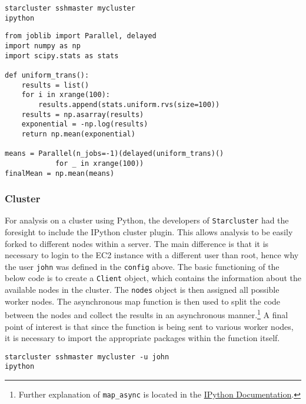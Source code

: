 \documentclass[12pt, letterpaper]{article}
\begin{document}
\begin{verbatim}
starcluster sshmaster mycluster
ipython
\end{verbatim}

\begin{lstlisting}
from joblib import Parallel, delayed
import numpy as np
import scipy.stats as stats

def uniform_trans():
    results = list()
    for i in xrange(100):
        results.append(stats.uniform.rvs(size=100))
    results = np.asarray(results)
    exponential = -np.log(results)
    return np.mean(exponential)
    
means = Parallel(n_jobs=-1)(delayed(uniform_trans)() 
            for _ in xrange(100))
finalMean = np.mean(means)

\end{lstlisting}

\subsubsection*{Cluster}

For analysis on a cluster using Python, the developers of \texttt{Starcluster} 
had the foresight to include the IPython \citep{ipython} cluster plugin. This allows 
analysis to be easily forked to different nodes within a server. The main 
difference is that it is necessary to login to the EC2 instance with a different 
user than root, hence why the user \texttt{john} was defined in the \texttt{config} 
above. The basic functioning of the below code is to create a \texttt{Client} object, 
which contains the information about the available nodes in the cluster. The \texttt{nodes}
object is then assigned all possible worker nodes. The asynchronous map function is then used
to split the code between the nodes and collect the results in an asynchronous 
manner.\footnote{Further explanation of \texttt{map\_async} is located in the 
\href{http://ipython.org/ipython-doc/stable/parallel/parallel\_multiengine.html\#non-locking-execution}{IPython Documentation}.}
A final point of interest is that since the function is being sent to various worker nodes, 
it is necessary to import the appropriate packages within the function itself. 

\begin{verbatim}
starcluster sshmaster mycluster -u john
ipython
\end{verbatim}
\end{document}
